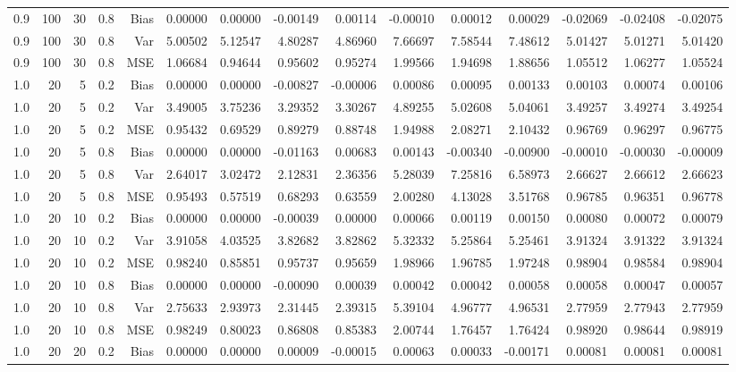 \begin{table}[!htbp]
\begin{tabular}{lrrrrrrrrrrrrrr}
0.9 & 100 & 30 & 0.8 & Bias & 0.00000 & 0.00000 & -0.00149 & 0.00114 & -0.00010 & 0.00012 & 0.00029 & -0.02069 & -0.02408 & -0.02075 \\
0.9 & 100 & 30 & 0.8 & Var & 5.00502 & 5.12547 & 4.80287 & 4.86960 & 7.66697 & 7.58544 & 7.48612 & 5.01427 & 5.01271 & 5.01420 \\
0.9 & 100 & 30 & 0.8 & MSE & 1.06684 & 0.94644 & 0.95602 & 0.95274 & 1.99566 & 1.94698 & 1.88656 & 1.05512 & 1.06277 & 1.05524 \\
1.0 &  20 &  5 & 0.2 & Bias & 0.00000 & 0.00000 & -0.00827 & -0.00006 & 0.00086 & 0.00095 & 0.00133 & 0.00103 & 0.00074 & 0.00106 \\
1.0 &  20 &  5 & 0.2 & Var & 3.49005 & 3.75236 & 3.29352 & 3.30267 & 4.89255 & 5.02608 & 5.04061 & 3.49257 & 3.49274 & 3.49254 \\
1.0 &  20 &  5 & 0.2 & MSE & 0.95432 & 0.69529 & 0.89279 & 0.88748 & 1.94988 & 2.08271 & 2.10432 & 0.96769 & 0.96297 & 0.96775 \\
1.0 &  20 &  5 & 0.8 & Bias & 0.00000 & 0.00000 & -0.01163 & 0.00683 & 0.00143 & -0.00340 & -0.00900 & -0.00010 & -0.00030 & -0.00009 \\
1.0 &  20 &  5 & 0.8 & Var & 2.64017 & 3.02472 & 2.12831 & 2.36356 & 5.28039 & 7.25816 & 6.58973 & 2.66627 & 2.66612 & 2.66623 \\
1.0 &  20 &  5 & 0.8 & MSE & 0.95493 & 0.57519 & 0.68293 & 0.63559 & 2.00280 & 4.13028 & 3.51768 & 0.96785 & 0.96351 & 0.96778 \\
1.0 &  20 & 10 & 0.2 & Bias & 0.00000 & 0.00000 & -0.00039 & 0.00000 & 0.00066 & 0.00119 & 0.00150 & 0.00080 & 0.00072 & 0.00079 \\
1.0 &  20 & 10 & 0.2 & Var & 3.91058 & 4.03525 & 3.82682 & 3.82862 & 5.32332 & 5.25864 & 5.25461 & 3.91324 & 3.91322 & 3.91324 \\
1.0 &  20 & 10 & 0.2 & MSE & 0.98240 & 0.85851 & 0.95737 & 0.95659 & 1.98966 & 1.96785 & 1.97248 & 0.98904 & 0.98584 & 0.98904 \\
1.0 &  20 & 10 & 0.8 & Bias & 0.00000 & 0.00000 & -0.00090 & 0.00039 & 0.00042 & 0.00042 & 0.00058 & 0.00058 & 0.00047 & 0.00057 \\
1.0 &  20 & 10 & 0.8 & Var & 2.75633 & 2.93973 & 2.31445 & 2.39315 & 5.39104 & 4.96777 & 4.96531 & 2.77959 & 2.77943 & 2.77959 \\
1.0 &  20 & 10 & 0.8 & MSE & 0.98249 & 0.80023 & 0.86808 & 0.85383 & 2.00744 & 1.76457 & 1.76424 & 0.98920 & 0.98644 & 0.98919 \\
1.0 &  20 & 20 & 0.2 & Bias & 0.00000 & 0.00000 & 0.00009 & -0.00015 & 0.00063 & 0.00033 & -0.00171 & 0.00081 & 0.00081 & 0.00081 \\

\end{tabular}
\end{table}
